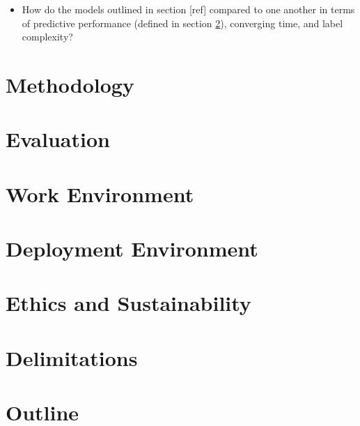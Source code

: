 \begin{itemize}
  \item How do the models  outlined in section [ref] compared to one another in terms of predictive performance (defined in section \ref{evaluation}), converging time, and  label complexity?
\end{itemize}

\section{Methodology}
\section{Evaluation}
\label{evaluation}
\section{Work Environment}
\section{Deployment Environment}
\section{Ethics and Sustainability}
\section{Delimitations}
\section{Outline}
